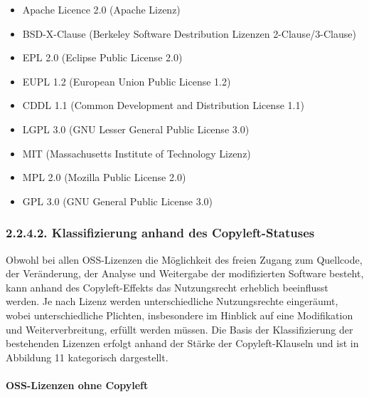\begin{itemize}
    \item Apache Licence 2.0 (Apache Lizenz)
    \item BSD-X-Clause (Berkeley Software Destribution Lizenzen 2-Clause/3-Clause)
    \item EPL 2.0 (Eclipse Public License 2.0)
    \item EUPL 1.2 (European Union Public License 1.2)
    \item CDDL 1.1 (Common Development and Distribution License 1.1)
    \item LGPL 3.0 (GNU Lesser General Public License 3.0)
    \item MIT (Massachusetts Institute of Technology Lizenz)
    \item MPL 2.0 (Mozilla Public License 2.0)
    \item GPL 3.0 (GNU General Public License 3.0)
\end{itemize}

\subsubsection{2.2.4.2. Klassifizierung anhand des Copyleft-Statuses}

Obwohl bei allen OSS-Lizenzen die Möglichkeit des freien Zugang zum Quellcode, der Veränderung, der Analyse und Weitergabe der modifizierten Software besteht, kann anhand des Copyleft-Effekts das Nutzungsrecht erheblich beeinflusst werden. Je nach Lizenz werden unterschiedliche Nutzungsrechte eingeräumt, wobei  unterschiedliche Plichten, insbesondere im Hinblick auf eine Modifikation und Weiterverbreitung, erfüllt werden müssen. Die Basis der Klassifizierung der bestehenden Lizenzen erfolgt anhand der Stärke der Copyleft-Klauseln und ist in Abbildung 11 kategorisch dargestellt.

\paragraph{OSS-Lizenzen ohne Copyleft}$~$

